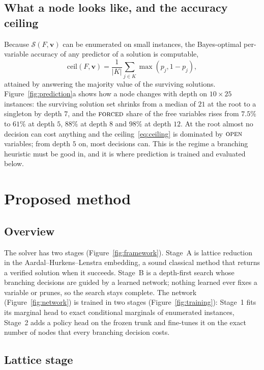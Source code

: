 \documentclass[final,5p,times,twocolumn,authoryear]{elsarticle}
\newcommand{\SOL}{\mathcal{S}}
\newcommand{\FORCED}{\textsc{forced}}
\newcommand{\FREE}{\textsc{open}}
\begin{document}
\subsection{What a node looks like, and the accuracy ceiling}
\label{sec:problem-ceiling}

Because $\SOL(F,\mathbf{v})$ can be enumerated on small instances, the Bayes-optimal per-variable accuracy of any predictor of a solution is computable,
\begin{equation}
\mathrm{ceil}(F,\mathbf{v})=\frac{1}{|K|}\sum_{j\in K}\max(p_j,1-p_j),
\label{eq:ceiling}
\end{equation}
attained by answering the majority value of the surviving solutions. Figure~\ref{fig:prediction}a shows how a node changes with depth on $10\times25$ instances: the surviving solution set shrinks from a median of $21$ at the root to a singleton by depth $7$, and the $\FORCED$ share of the free variables rises from $7.5\%$ to $61\%$ at depth $5$, $88\%$ at depth $8$ and $98\%$ at depth $12$. At the root almost no decision can cost anything and the ceiling~\eqref{eq:ceiling} is dominated by $\FREE$ variables; from depth $5$ on, most decisions can. This is the regime a branching heuristic must be good in, and it is where prediction is trained and evaluated below.

\section{Proposed method}
\label{sec:method}

\subsection{Overview}
\label{sec:method-overview}

The solver has two stages (Figure~\ref{fig:framework}). Stage~A is lattice reduction in the Aardal--Hurkens--Lenstra embedding, a sound classical method that returns a verified solution when it succeeds. Stage~B is a depth-first search whose branching decisions are guided by a learned network; nothing learned ever fixes a variable or prunes, so the search stays complete. The network (Figure~\ref{fig:network}) is trained in two stages (Figure~\ref{fig:training}): Stage~1 fits its marginal head to exact conditional marginals of enumerated instances, Stage~2 adds a policy head on the frozen trunk and fine-tunes it on the exact number of nodes that every branching decision costs.

\subsection{Lattice stage}
\label{sec:method-lattice}
\end{document}
